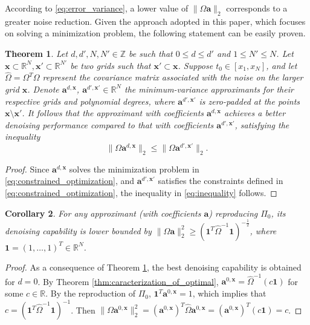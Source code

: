 \documentclass[preprint]{elsarticle}       %
\newcommand{\R}{\mathds{R}}
\newcommand{\ba}{\bm{a}}
\newcommand{\bx}{\bm{x}}
\theoremstyle{plain}
\newtheorem{thm}{Theorem}
\newtheorem{cor}[thm]{Corollary}
\theoremstyle{remark}
\begin{document}
According to \eqref{eq:error_variance}, a lower value of $\|\Omega \ba\|_2$ corresponds to a greater noise reduction. Given the approach adopted in this paper, which focuses on solving a minimization problem, the following statement can be easily proven.
\begin{thm} \label{thm:order}
	Let $d, d',N,N' \in \mathds{Z}$ be such that $0\leq d \leq d'$ and $1\leq N' \leq N$. Let $\bx\subset\R^N, \bx'\subset\R^{N'}$ be two grids such that $\bx' \subset \bx$. Suppose $t_0 \in [x_1, x_N]$, and let $\hat{\Omega} = \Omega^T \Omega$ represent the covariance matrix associated with the noise on the larger grid $\bx$. Denote $\ba^{d,\bx}$, $\ba^{d',\bx'}\in\R^N$ the minimum-variance approximants for their respective grids and polynomial degrees, where $\ba^{d',\bx'}$ is zero-padded at the points $\bx \setminus \bx'$.
	It follows that the approximant with coefficients $\ba^{d,\bx}$ achieves a better denoising performance compared to that with coefficients $\ba^{d',\bx'}$, satisfying the inequality
	\begin{equation} \label{eq:inequality}
		\|\Omega \ba^{d,\bx}\|_2 \leq \|\Omega \ba^{d',\bx'}\|_2.
	\end{equation}
\end{thm}
\begin{proof}
	Since $\ba^{d,\bx}$ solves the minimization problem in \eqref{eq:constrained_optimization}, and $\ba^{d',\bx'}$ satisfies the constraints defined in \eqref{eq:constrained_optimization}, the inequality in \eqref{eq:inequality} follows.
\end{proof}

\begin{cor}
	For any approximant (with coefficients $\ba$) reproducing $\Pi_0$, its denoising capability is lower bounded by $\|\Omega\ba\|_2^2 \geq (\mathbf{1}^T\hat\Omega^{-1}\mathbf{1})^{-\frac12}$,
	where $\mathbf{1} = (1,\ldots,1)^T \in\R^N$.
\end{cor}
\begin{proof}
	As a consequence of Theorem \ref{thm:order}, the best denoising capability is obtained for $d=0$. By Theorem \ref{thm:caracterization_of_optimal}, $\ba^{0,\bx} = \hat\Omega^{-1}(c \mathbf{1})$ for some $c\in\R$. By the reproduction of $\Pi_0$, $\mathbf{1}^T\ba^{0,\bx} = 1$, which implies that $c=(\mathbf{1}^T\hat\Omega^{-1}\mathbf{1})^{-1}$. Then $\|\Omega\ba^{0,\bx}\|^2_2 = (\ba^{0,\bx})^T\hat\Omega\ba^{0,\bx} = (\ba^{0,\bx})^T (c \mathbf{1}) = c$.
\end{proof}
\end{document}
